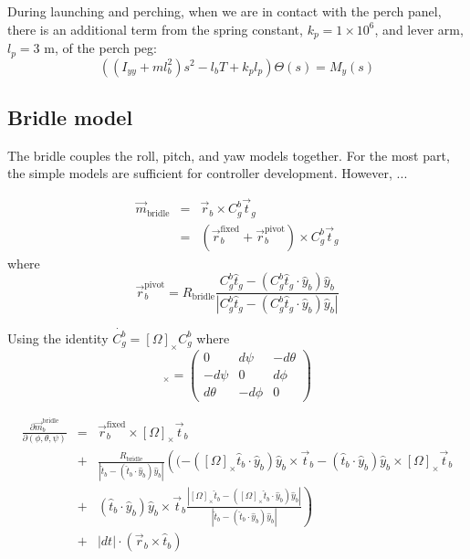 \documentclass[11pt]{amsart}
\begin{document}
During launching and perching, when we are in contact with the perch
panel, there is an additional term from the spring constant,
$k_p = 1 \times 10^6$, and lever arm, $l_p = 3$ m, of the perch peg:
\begin{equation}
\left((I_{yy} + m l_b^2) s^2 - l_b T + k_p l_p \right) \Theta(s) = M_y(s)
\end{equation}


\subsection{Bridle model}

The bridle couples the roll, pitch, and yaw models together.  For the
most part, the simple models are sufficient for controller
development.  However, ...


\begin{eqnarray}
\vec{m}_{\mathrm{bridle}}
&=& \vec{r}_b \times C_g^b \vec{t}_g \\
&=& (\vec{r}_b^{\mathrm{fixed}} + \vec{r}_b^{\mathrm{pivot}}) \times C_g^b \vec{t}_g
\end{eqnarray}
where
\begin{equation}
\vec{r}_b^{\mathrm{pivot}} = R_{\mathrm{bridle}}
\frac{C_g^b \hat{t}_g -  (C_g^b \hat{t}_g \cdot \hat{y}_b) \hat{y}_b}
{|C_g^b \hat{t}_g -  (C_g^b \hat{t}_g \cdot \hat{y}_b) \hat{y}_b|}
\end{equation}

Using the identity $\dot{C_g^b} = [\Omega]_{\times} C_g^b$ where
\begin{equation}
[\Omega]_{\times} = \left(
\begin{array}{ccc}
0 & d\psi & -d\theta \\
-d\psi & 0 & d\phi \\
d\theta & -d\phi & 0
\end{array}
\right)
\end{equation}

\begin{eqnarray}
\frac{\partial \vec{m}_b^{\mathrm{bridle}}}{\partial (\phi, \theta, \psi)}
&=&
\vec{r}_b^{\mathrm{fixed}} \times [\Omega]_{\times} \vec{t}_b \\
&+& \frac{R_{\mathrm{bridle}}}
{|\hat{t}_b -  (\hat{t}_b \cdot \hat{y}_b) \hat{y}_b|}
\left(
(-([\Omega]_{\times} \hat{t}_b \cdot \hat{y}_b) \hat{y}_b \times \vec{t}_b
-(\hat{t}_b \cdot \hat{y}_b) \hat{y}_b \times [\Omega]_{\times} \vec{t}_b \right. \\
&+& \left. (\hat{t}_b \cdot \hat{y}_b) \hat{y}_b \times \vec{t}_b
\frac{|[\Omega]_{\times} \hat{t}_b -
([\Omega]_{\times} \hat{t}_b \cdot \hat{y}_b) \hat{y}_b|}{|\hat{t}_b -
(\hat{t}_b \cdot \hat{y}_b) \hat{y}_b|} \right) \\
&+& |dt| \cdot (\vec{r}_b \times \hat{t}_b)
\end{eqnarray}
\end{document}
